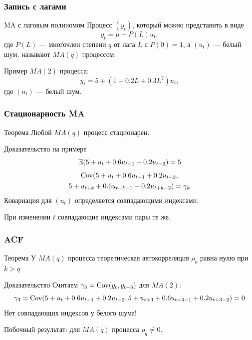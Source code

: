 \begin{frame}
  \frametitle{Запись с лагами}

  \begin{block}{MA с лаговым полиномом}
    Процесс $(y_t)$, который \alert{можно} представить в виде 
    \[
    y_t = \mu + P(L) u_t,  
    \]
    где $P(L)$ — многочлен степени $q$ от лага $L$ с $P(0)=1$, а $(u_t)$ — белый шум,
    называют $MA(q)$ процессом. 
  \end{block}

  \pause
  Пример $MA(2)$ процесса:
  \[
  y_t = 5 + (1 - 0.2 L + 0.3 L^2) u_t,
\]
где $(u_t)$ — белый шум. 
\end{frame}


\begin{frame}
  \frametitle{Стационарность MA}

  \begin{block}{Теорема}
    Любой $MA(q)$ процесс стационарен. 
  \end{block}

  \pause
  \begin{block}{Доказательство на примере}
    \[
      \mathbb{E}(5 + u_t + 0.6u_{t-1} + 0.2u_{t-2}) = 5
    \]
    \pause
    \begin{multline*}
      \operatorname{Cov}(5 + u_t + 0.6u_{t-1} + 0.2u_{t-2}, \\
      5 + u_{t+k} + 0.6u_{t+k-1} + 0.2u_{t+k-2}) = \gamma_k
    \end{multline*}
    Ковариация для $(u_t)$ определяется \alert{совпадающими} индексами. 

    При изменении $t$ совпадающие индексами пары те же.
  \end{block}
  

\end{frame}

\begin{frame}
  \frametitle{ACF}

  \begin{block}{Теорема}
    У $MA(q)$ процесса теоретическая автокорреляция $\rho_k$ равна нулю при $k>q$
  \end{block}
  \pause
  \begin{block}{Доказательство}
    Считаем $\gamma_3 = \operatorname{Cov}(y_t, y_{t+3})$ для $MA(2)$:
    \[
    \gamma_3 = \operatorname{Cov}(5 + u_t + 0.6u_{t-1} + 0.2u_{t-2}, 5 + u_{t+3} + 0.6u_{t+3-1} + 0.2u_{t+3-2}) = 0
    \]
    \alert{Нет совпадающих} индексов у белого шума!
  \end{block}
  \pause 
  Побочный результат: для $MA(q)$ процесса $\rho_q \neq 0$.
\end{frame}



